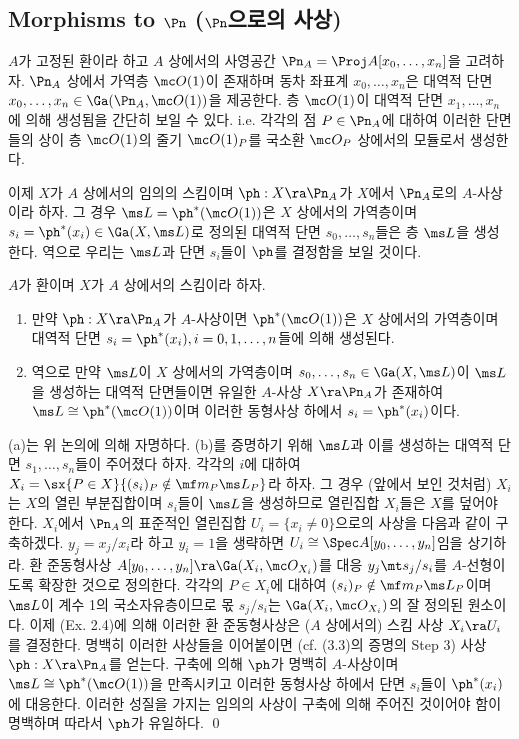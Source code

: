 	
	\subsection*{Morphisms to $\Pn$ ($\Pn$으로의 사상)}
	
	$A$가 고정된 환이라 하고 $A$ 상에서의 사영공간 $\Pn_A=\Proj A[x_0,\ldots,x_n]$을 고려하자.
	$\Pn_A$ 상에서 가역층 $\mc O(1)$이 존재하며 동차 좌표계 $x_0,\ldots,x_n$은
	대역적 단면 $x_0,\ldots,x_n\in\Ga(\Pn_A,\mc O(1))$을 제공한다.
	층 $\mc O(1)$이 대역적 단면 $x_1,\ldots,x_n$에 의해 생성됨을 간단히 보일 수 있다.
	i.e. 각각의 점 $P\in\Pn_A$에 대하여 이러한 단면들의 상이
	층 $\mc O(1)$의 줄기 $\mc O(1)_P$를 국소환 $\mc O_P$ 상에서의 모듈로서 생성한다.
	
	이제 $X$가 $A$ 상에서의 임의의 스킴이며 $\ph:X\ra\Pn_A$가 $X$에서 $\Pn_A$로의 $A$-사상이라 하자.
	그 경우 $\ms L=\ph^*(\mc O(1))$은 $X$ 상에서의 가역층이며 $s_i=\ph^*(x_i)\in\Ga(X,\ms L)$로 정의된 대역적 단면
	$s_0,\ldots,s_n$들은 층 $\ms L$을 생성한다.
	역으로 우리는 $\ms L$과 단면 $s_i$들이 $\ph$를 결정함을 보일 것이다.
	
	
	\begin{theorem}
	$A$가 환이며 $X$가 $A$ 상에서의 스킴이라 하자.
	\begin{enumerate}[label=(\alph*)]
	\item 만약 $\ph:X\ra\Pn_A$가 $A$-사상이면 $\ph^*(\mc O(1))$은 $X$ 상에서의 가역층이며
	대역적 단면 $s_i=\ph^*(x_i),i=0,1,\ldots,n$들에 의해 생성된다.
	\item 역으로 만약 $\ms L$이 $X$ 상에서의 가역층이며 $s_0,\ldots,s_n\in\Ga(X,\ms L)$이 $\ms L$을 생성하는 대역적 단면들이면
	유일한 $A$-사상 $X\ra\Pn_A$가 존재하여 $\ms L\cong\ph^*(\mc O(1))$이며 이러한 동형사상 하에서 $s_i=\ph^*(x_i)$이다.\\
	\end{enumerate}
	\pf (a)는 위 논의에 의해 자명하다. (b)를 증명하기 위해 $\ms L$과 이를 생성하는 대역적 단면 $s_1,\ldots,s_n$들이 주어졌다 하자.
	각각의 $i$에 대하여 $X_i=\sx{P\in X}{(s_i)_P\notin\mf m_P\ms L_P}$라 하자.
	그 경우 (앞에서 보인 것처럼) $X_i$는 $X$의 열린 부분집합이며 $s_i$들이 $\ms L$을 생성하므로 열린집합 $X_i$들은 $X$를 덮어야 한다.
	$X_i$에서 $\Pn_A$의 표준적인 열린집합 $U_i=\{x_i\ne 0\}$으로의 사상을 다음과 같이 구축하겠다.
	$y_j=x_j/x_i$라 하고 $y_i=1$을 생략하면 $U_i\cong\Spec A[y_0,\ldots,y_n]$임을 상기하라.
	환 준동형사상 $A[y_0,\ldots,y_n]\ra\Ga(X_i,\mc O_{X_i})$를 대응 $y_j\mt s_j/s_i$를 $A$-선형이도록 확장한 것으로 정의한다.
	각각의 $P\in X_i$에 대하여 $(s_i)_P\notin\mf m_P\ms L_P$이며 $\ms L$이 계수 1의 국소자유층이므로
	몫 $s_j/s_i$는 $\Ga(X_i,\mc O_{X_i})$의 잘 정의된 원소이다.
	이제 (Ex. 2.4)에 의해 이러한 환 준동형사상은 ($A$ 상에서의) 스킴 사상 $X_i\ra U_i$를 결정한다.
	명백히 이러한 사상들을 이어붙이면 (cf. (3.3)의 증명의 Step 3) 사상 $\ph:X\ra\Pn_A$를 얻는다.
	구축에 의해 $\ph$가 명백히 $A$-사상이며 $\ms L\cong\ph^*(\mc O(1))$을 만족시키고
	이러한 동형사상 하에서 단면 $s_i$들이 $\ph^*(x_i)$에 대응한다.
	이러한 성질을 가지는 임의의 사상이 구축에 의해 주어진 것이어야 함이 명백하며 따라서 $\ph$가 유일하다.
	\qed
	\end{theorem}
	
